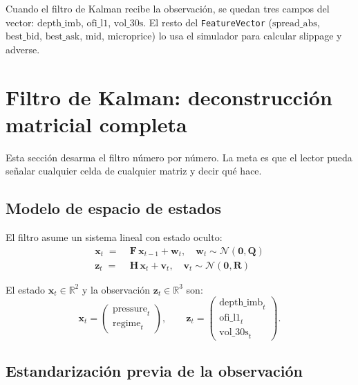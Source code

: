 \documentclass[journal,onecolumn,11pt]{IEEEtran}
\newcommand{\R}{\mathbb{R}}
\newcommand{\xv}{\mathbf{x}}
\newcommand{\zv}{\mathbf{z}}
\newcommand{\Fm}{\mathbf{F}}
\newcommand{\Hm}{\mathbf{H}}
\newcommand{\Qm}{\mathbf{Q}}
\newcommand{\Rm}{\mathbf{R}}
\begin{document}
Cuando el filtro de Kalman recibe la observación, se quedan tres
campos del vector: $\text{depth\_imb}$, $\text{ofi\_l1}$,
$\text{vol\_30s}$. El resto del \texttt{FeatureVector}
($\text{spread\_abs}$, $\text{best\_bid}$, $\text{best\_ask}$,
$\text{mid}$, $\text{microprice}$) lo usa el simulador para calcular
slippage y adverse.

\section{Filtro de Kalman: deconstrucción matricial completa}\label{sec:kalman}

Esta sección desarma el filtro número por número. La meta es que el
lector pueda señalar cualquier celda de cualquier matriz y decir qué
hace.

\subsection{Modelo de espacio de estados}

El filtro asume un sistema lineal con estado oculto:
\begin{align}
\xv_t \;=\;& \Fm\,\xv_{t-1} + \mathbf{w}_t,\quad \mathbf{w}_t\sim\mathcal{N}(\mathbf{0},\Qm)
\label{eq:dynamics}\\[2pt]
\zv_t \;=\;& \Hm\,\xv_t + \mathbf{v}_t,\quad \mathbf{v}_t\sim\mathcal{N}(\mathbf{0},\Rm)
\label{eq:measurement}
\end{align}

\noindent
El estado $\xv_t \in \R^2$ y la observación $\zv_t \in \R^3$ son:
\begin{equation}
\xv_t = \begin{pmatrix}\text{pressure}_t \\ \text{regime}_t\end{pmatrix},
\qquad
\zv_t = \begin{pmatrix}\text{depth\_imb}_t \\ \text{ofi\_l1}_t \\ \text{vol\_30s}_t\end{pmatrix}.
\label{eq:state-obs}
\end{equation}

\subsection{Estandarización previa de la observación}
\end{document}
